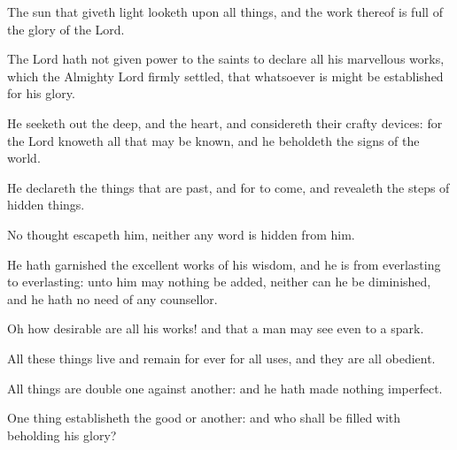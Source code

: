 {\par }{\PP {}The sun that giveth light looketh upon all things, and the work thereof is full of the glory of the Lord.
\par }{\PP {}The Lord hath not given power to the saints to declare all his marvellous works, which the Almighty Lord firmly settled, that whatsoever is might be established for his glory.
\par }{\PP {}He seeketh out the deep, and the heart, and considereth their crafty devices: for the Lord knoweth all that may be known, and he beholdeth the signs of the world.
\par }{\PP {}He declareth the things that are past, and for to come, and revealeth the steps of hidden things.
\par }{\PP {}No thought escapeth him, neither any word is hidden from him.
\par }{\PP {}He hath garnished the excellent works of his wisdom, and he is from everlasting to everlasting: unto him may nothing be added, neither can he be diminished, and he hath no need of any counsellor.
\par }{\PP {}Oh how desirable are all his works! and that a man may see even to a spark.
\par }{\PP {}All these things live and remain for ever for all uses, and they are all obedient.
\par }{\PP {}All things are double one against another: and he hath made nothing imperfect.
\par }{\PP {}One thing establisheth the good or another: and who shall be filled with beholding his glory?

}
